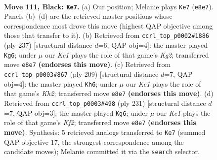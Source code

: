 \documentclass[11pt]{article}
\begin{document}
\clearpage

\begin{figure}[p]\centering
\begin{subfigure}{0.46\textwidth}\centering
\resizebox{\linewidth}{!}{%
\newchessgame
\chessboard[
  setfen={4k3/8/4p3/4P3/5PR1/8/2R2K2/7r b - - 8 111},
  showmover=false,
  pgfstyle=straightmove, color=movearrow, markmove={e8-e7}
]}
\caption{}
\end{subfigure}\hfill
\begin{subfigure}{0.46\textwidth}\centering
\resizebox{\linewidth}{!}{%
\newchessgame
\chessboard[
  setfen={8/6k1/8/6p1/6P1/5P2/1R3K2/r7 b - - 4 119},
  showmover=false,
  pgfstyle=straightmove, color=movearrow, markmove={g7-g6}
]}
\caption{}
\end{subfigure}
\\[4pt]
\begin{subfigure}{0.46\textwidth}\centering
\resizebox{\linewidth}{!}{%
\newchessgame
\chessboard[
  setfen={8/7k/5r2/7p/7P/6P1/3R2K1/8 b - - 15 105},
  showmover=false,
  pgfstyle=straightmove, color=movearrow, markmove={h7-h6}
]}
\caption{}
\end{subfigure}\hfill
\begin{subfigure}{0.46\textwidth}\centering
\resizebox{\linewidth}{!}{%
\newchessgame
\chessboard[
  setfen={8/5k2/8/6p1/6P1/2R2K1P/8/r7 b - - 71 116},
  showmover=false,
  pgfstyle=straightmove, color=movearrow, markmove={f7-g6}
]}
\caption{}
\end{subfigure}
\caption{\textbf{Move 111, Black: \texttt{Ke7}.} (a) Our position; Melanie plays \texttt{Ke7} (\texttt{e8e7}). Panels (b)--(d) are the retrieved master positions whose correspondence most drove this move (highest QAP objective among those that transfer to it). (b) Retrieved from \texttt{ccrl\_top\_p0002\#1886} (ply 237) [structural distance $d$=6, QAP obj=4]: the master played \texttt{Kg6}; under $\mu$ our \emph{Ke1} plays the role of that game's \emph{Kg2}; transferred move \texttt{e8e7} \textbf{(endorses this move)}. (c) Retrieved from \texttt{ccrl\_top\_p0003\#867} (ply 209) [structural distance $d$=7, QAP obj=4]: the master played \texttt{Kh6}; under $\mu$ our \emph{Ke1} plays the role of that game's \emph{Kh2}; transferred move \texttt{e8e7} \textbf{(endorses this move)}. (d) Retrieved from \texttt{ccrl\_top\_p0003\#498} (ply 231) [structural distance $d$=7, QAP obj=3]: the master played \texttt{Kg6}; under $\mu$ our \emph{Ke1} plays the role of that game's \emph{Kf2}; transferred move \texttt{e8e7} \textbf{(endorses this move)}. Synthesis: 5 retrieved analogs transferred to \texttt{Ke7} (summed QAP objective 17, the strongest correspondence among the candidate moves); Melanie committed it via the \texttt{search} selector.}
\label{fig:thought-m221}
\end{figure}
\end{document}
